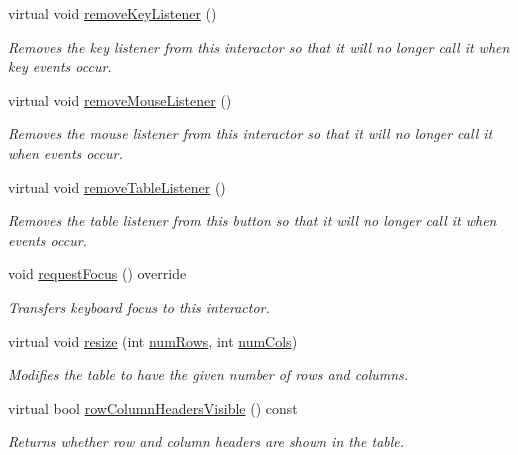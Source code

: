 \begin{DoxyCompactItemize}
virtual void \mbox{\hyperlink{classsgl_1_1GInteractor_a43095f41cab3be732b49f29970484b05}{remove\+Key\+Listener}} ()
\begin{DoxyCompactList}\small\item\em Removes the key listener from this interactor so that it will no longer call it when key events occur. \end{DoxyCompactList}\item 
virtual void \mbox{\hyperlink{classsgl_1_1GInteractor_aff47f71ce47e688a07c9d38dc92fcc11}{remove\+Mouse\+Listener}} ()
\begin{DoxyCompactList}\small\item\em Removes the mouse listener from this interactor so that it will no longer call it when events occur. \end{DoxyCompactList}\item 
virtual void \mbox{\hyperlink{classsgl_1_1GTable_a5c18bacaf370f9c3da545f5c6e6e9515}{remove\+Table\+Listener}} ()
\begin{DoxyCompactList}\small\item\em Removes the table listener from this button so that it will no longer call it when events occur. \end{DoxyCompactList}\item 
void \mbox{\hyperlink{classsgl_1_1GTable_a5921efd0a5a83eacebdadb749fb3ea7a}{request\+Focus}} () override
\begin{DoxyCompactList}\small\item\em Transfers keyboard focus to this interactor. \end{DoxyCompactList}\item 
virtual void \mbox{\hyperlink{classsgl_1_1GTable_a600810b1a74ec9a062ce38666a9e7602}{resize}} (int \mbox{\hyperlink{classsgl_1_1GTable_a00b7e69dd5c43e42cc91db26c459ad8b}{num\+Rows}}, int \mbox{\hyperlink{classsgl_1_1GTable_a5997e103e56aae1db12e1f7f02e136c5}{num\+Cols}})
\begin{DoxyCompactList}\small\item\em Modifies the table to have the given number of rows and columns. \end{DoxyCompactList}\item 
virtual bool \mbox{\hyperlink{classsgl_1_1GTable_a92c3dff0296ec16823a1172a9f9f07e6}{row\+Column\+Headers\+Visible}} () const
\begin{DoxyCompactList}\small\item\em Returns whether row and column headers are shown in the table. \end{DoxyCompactList}\item 

\end{DoxyCompactItemize}

